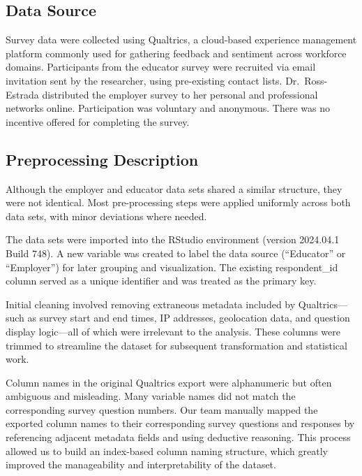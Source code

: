 \documentclass[
  11pt,
  letterpaper,
  DIV=11,
  numbers=noendperiod]{scrartcl}
\numberwithin{figure}{section}
\begin{document}
\hypertarget{data-source}{%
\subsection{Data Source}\label{data-source}}

Survey data were collected using Qualtrics, a cloud-based experience
management platform commonly used for gathering feedback and sentiment
across workforce domains. Participants from the educator survey were
recruited via email invitation sent by the researcher, using
pre-existing contact lists. Dr.~Ross-Estrada distributed the employer
survey to her personal and professional networks online. Participation
was voluntary and anonymous. There was no incentive offered for
completing the survey.

\hypertarget{preprocessing-description}{%
\subsection{Preprocessing Description}\label{preprocessing-description}}

Although the employer and educator data sets shared a similar structure,
they were not identical. Most pre-processing steps were applied
uniformly across both data sets, with minor deviations where needed.

The data sets were imported into the RStudio environment (version
2024.04.1 Build 748). A new variable was created to label the data
source (``Educator'' or ``Employer'') for later grouping and
visualization. The existing respondent\_id column served as a unique
identifier and was treated as the primary key.

Initial cleaning involved removing extraneous metadata included by
Qualtrics---such as survey start and end times, IP addresses,
geolocation data, and question display logic---all of which were
irrelevant to the analysis. These columns were trimmed to streamline the
dataset for subsequent transformation and statistical work.

Column names in the original Qualtrics export were alphanumeric but
often ambiguous and misleading. Many variable names did not match the
corresponding survey question numbers. Our team manually mapped the
exported column names to their corresponding survey questions and
responses by referencing adjacent metadata fields and using deductive
reasoning. This process allowed us to build an index-based column naming
structure, which greatly improved the manageability and interpretability
of the dataset.
\end{document}
